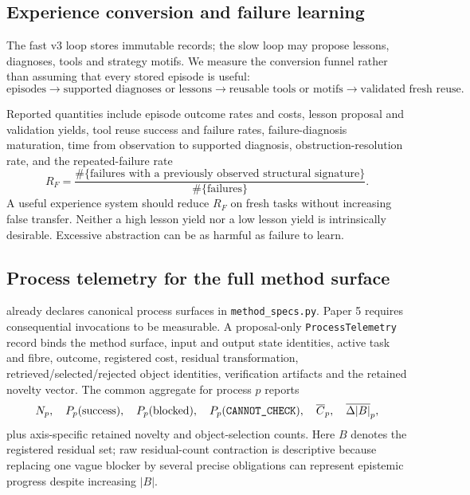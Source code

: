 \subsection{Experience conversion and failure learning}

The fast v3 loop stores immutable \TaskEpisode{} records; the slow loop may propose lessons, diagnoses, tools and strategy motifs. We measure the conversion funnel rather than assuming that every stored episode is useful:
\[
\text{episodes}
\rightarrow
\text{supported diagnoses or lessons}
\rightarrow
\text{reusable tools or motifs}
\rightarrow
\text{validated fresh reuse}.
\]

Reported quantities include episode outcome rates and costs, lesson proposal and validation yields, tool reuse success and failure rates, failure-diagnosis maturation, time from observation to supported diagnosis, obstruction-resolution rate, and the repeated-failure rate
\[
R_F=
\frac{\#\{\text{failures with a previously observed structural signature}\}}
     {\#\{\text{failures}\}}.
\]
A useful experience system should reduce $R_F$ on fresh tasks without increasing false transfer. Neither a high lesson yield nor a low lesson yield is intrinsically desirable. Excessive abstraction can be as harmful as failure to learn.

\subsection{Process telemetry for the full method surface}

\RAKL{} already declares canonical process surfaces in \texttt{method\_specs.py}. Paper 5 requires consequential invocations to be measurable. A proposal-only \texttt{ProcessTelemetry} record binds the method surface, input and output state identities, active task and fibre, outcome, registered cost, residual transformation, retrieved/selected/rejected object identities, verification artifacts and the retained novelty vector. The common aggregate for process $p$ reports
\[
N_p,\quad
P_p(\mathrm{success}),\quad
P_p(\mathrm{blocked}),\quad
P_p(\texttt{CANNOT\_CHECK}),\quad
\overline C_p,\quad
\overline{\Delta |B|}_p,
\]
plus axis-specific retained novelty and object-selection counts. Here $B$ denotes the registered residual set; raw residual-count contraction is descriptive because replacing one vague blocker by several precise obligations can represent epistemic progress despite increasing $|B|$.

